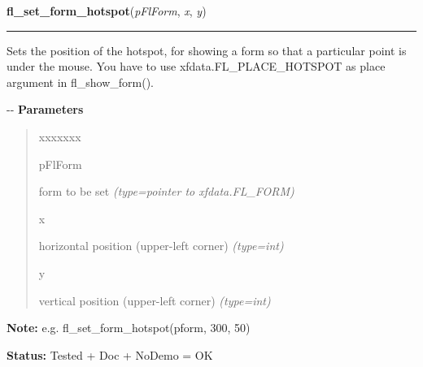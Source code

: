     \label{xformslib:flbasic:fl_set_form_hotspot}

    \vspace{0.5ex}

\hspace{.8\funcindent}\begin{boxedminipage}{\funcwidth}

    \raggedright \textbf{fl\_set\_form\_hotspot}(\textit{pFlForm}, \textit{x}, \textit{y})

    \vspace{-1.5ex}

    \rule{\textwidth}{0.5\fboxrule}
\setlength{\parskip}{2ex}

Sets the position of the hotspot, for showing a form so that a
particular point is under the mouse. You have to use
xfdata.FL\_PLACE\_HOTSPOT as place argument in fl\_show\_form().

-{}-
\setlength{\parskip}{1ex}
      \textbf{Parameters}
      \vspace{-1ex}

      \begin{quote}
        \begin{Ventry}{xxxxxxx}

          \item[pFlForm]


form to be set
            {\it (type=pointer to xfdata.FL\_FORM)}

          \item[x]


horizontal position (upper-left corner)
            {\it (type=int)}

          \item[y]


vertical position (upper-left corner)
            {\it (type=int)}

        \end{Ventry}

      \end{quote}

\textbf{Note:} 
e.g. fl\_set\_form\_hotspot(pform, 300, 50)


\textbf{Status:} 
Tested + Doc + NoDemo = OK


    \end{boxedminipage}

    \label{xformslib:flbasic:fl_set_form_hotobject}

